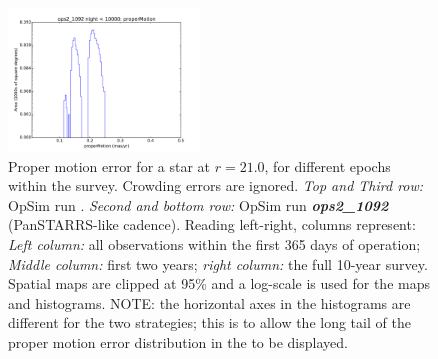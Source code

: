 \begin{figure}[ht]
\begin{center}
  \includegraphics[width=2.0in]{./figs/milkyway/MW_Astrom_pmError_1092_10y_hst.pdf}
  \end{center}
  \caption{Proper motion error for a star at $r=21.0$, for different epochs within the survey. Crowding errors are ignored. {\it Top and Third row:} OpSim run . {\it Second and bottom row:} OpSim run {\it \bf ops2\_1092} (PanSTARRS-like cadence). Reading left-right, columns represent: {\it Left column:} all observations within the first 365 days of operation; {\it Middle column:} first two years; {\it right column:} the full 10-year survey. Spatial maps are clipped at 95\% and a log-scale is used for the maps and histograms. NOTE: the horizontal axes in the histograms are different for the two strategies; this is to allow the long tail of the proper motion error distribution in the  to be displayed.}
  \label{fig_astrom_ByTime_pmError}
\end{figure}


